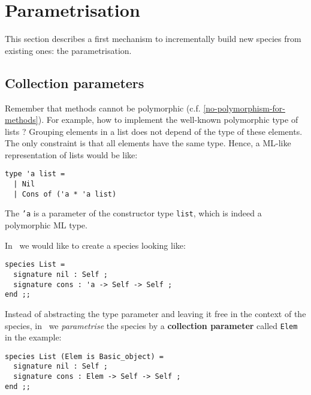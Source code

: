 




\section{Parametrisation}
\label{parametrisation}

This section describes a first mechanism to incrementally build new
species from existing ones: the parametrisation. 
\subsection{Collection parameters}
\label{collection-parameter}
Remember that methods cannot be polymorphic
(c.f. \ref{no-polymorphism-for-methods}). For
example, how to implement the well-known polymorphic type of 
lists ?  Grouping elements in a list does not
depend  of
the type of these elements. The only constraint is that all elements
have the same type. Hence, a ML-like representation of lists would be
like:
{\scriptsize
\lstset{language=Caml}
\begin{lstlisting}
type 'a list =
  | Nil
  | Cons of ('a * 'a list)
\end{lstlisting}
}

The {\tt 'a} is a parameter of the constructor type {\tt list}, which
is indeed a polymorphic ML type. 

 In \focal\ we would like to create a
species looking like: {\scriptsize
\begin{lstlisting}
species List =
  signature nil : Self ;
  signature cons : 'a -> Self -> Self ;
end ;;
\end{lstlisting}
}

Instead of abstracting the type parameter and leaving it free in the
context of the species, in \focal\ we {\em parametrise} the species
by a {\bf collection parameter} called  {\tt Elem} in the example:
{\scriptsize
\begin{lstlisting}
species List (Elem is Basic_object) =
  signature nil : Self ;
  signature cons : Elem -> Self -> Self ;
end ;;
\end{lstlisting}
}

